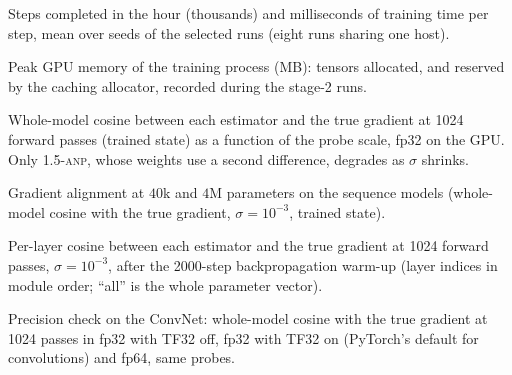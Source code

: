 \documentclass{article}
\newcommand{\method}[1]{\textsc{#1}}
\newcommand{\ANPb}{\method{1.5-anp}}
\begin{document}
\label{app:resources}
\begin{table}[ht]
  \caption{Steps completed in the hour (thousands) and milliseconds of training time
  per step, mean over seeds of the selected runs (eight runs sharing one host).}
  \label{tab:steps}
  \centering
  \footnotesize
  \setlength{\tabcolsep}{4pt}
  \resizebox{\linewidth}{!}{}
\end{table}

\begin{table}[ht]
  \caption{Peak GPU memory of the training process (MB): tensors allocated, and
  reserved by the caching allocator, recorded during the stage-2 runs.}
  \label{tab:memory}
  \centering
  \footnotesize
  \setlength{\tabcolsep}{4pt}
  \resizebox{\linewidth}{!}{}
\end{table}

\label{app:align}
\begin{table}[ht]
  \caption{Whole-model cosine between each estimator and the true gradient at 1024
  forward passes (trained state) as a function of the probe scale, fp32 on the GPU.
  Only \ANPb{}, whose weights use a second difference, degrades as $\sigma$ shrinks.}
  \label{tab:alignsigma}
  \centering
  \scriptsize
  
\end{table}

\begin{table}[ht]
  \caption{Gradient alignment at $40$k and $4$M parameters on the sequence models
  (whole-model cosine with the true gradient, $\sigma=10^{-3}$, trained state).}
  \label{tab:align4m}
  \centering
  \scriptsize
  
\end{table}

\begin{table}[ht]
  \caption{Per-layer cosine between each estimator and the true gradient at 1024
  forward passes, $\sigma=10^{-3}$, after the 2000-step backpropagation warm-up
  (layer indices in module order; ``all'' is the whole parameter vector).}
  \label{tab:align}
  \centering
  \scriptsize
  
\end{table}

\begin{table}[ht]
  \caption{Precision check on the ConvNet: whole-model cosine with the true gradient
  at 1024 passes in fp32 with TF32 off, fp32 with TF32 on (PyTorch's default for
  convolutions) and fp64, same probes.}
  \label{tab:precision}
  \centering
  \footnotesize
  
\end{table}
\end{document}
